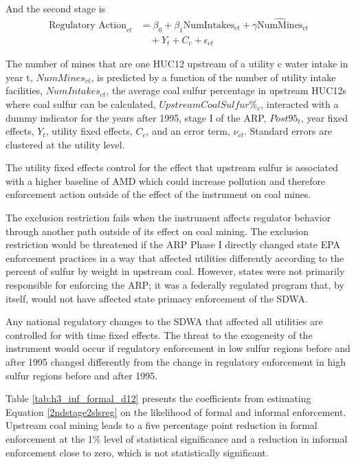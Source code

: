 \documentclass{article}
\begin{document}
And the second stage is
\begin{equation}\label{2ndstage2slsreg}
\begin{split}
\text{Regulatory Action}_{ct} &= \beta_0 + \beta_1\text{NumIntakes}_{ct} + \gamma\widehat{\text{NumMines}}_{ct} \\
&\quad + Y_t + C_c + \epsilon_{ct}
\end{split}
\end{equation}

The number of mines that are one HUC12 upstream of a utility c water intake in year t, $NumMines_{ct}$, is predicted by a function of the number of utility intake facilities, $NumIntakes_{ct}$, the average coal sulfur percentage in upstream HUC12s where coal sulfur can be calculated, $UpstreamCoalSulfur\%_c$, interacted with a dummy indicator for the years after 1995, stage I of the ARP, $Post95_t$, year fixed effects, $Y_t$, utility fixed effects, $C_c$, and an error term, $\nu_{ct}$. Standard errors are clustered at the utility level.

The utility fixed effects control for the effect that upstream sulfur is associated with a higher baseline of AMD which could increase pollution and therefore enforcement action outside of the effect of the instrument on coal mines.

The exclusion restriction fails when the instrument affects regulator behavior through another path outside of its effect on coal mining. The exclusion restriction would be threatened if the ARP Phase I directly changed state EPA enforcement practices in a way that affected utilities differently according to the percent of sulfur by weight in upstream coal. However, states were not primarily responsible for enforcing the ARP; it was a federally regulated program that, by itself, would not have affected state primacy enforcement of the SDWA.

Any national regulatory changes to the SDWA that affected all utilities are controlled for with time fixed effects. The threat to the exogeneity of the instrument would occur if regulatory enforcement in low sulfur regions before and after 1995 changed differently from the change in regulatory enforcement in high sulfur regions before and after 1995.

Table \ref{tab:h3_inf_formal_d12} presents the coefficients from estimating Equation \ref{2ndstage2slsreg} on the likelihood of formal and informal enforcement. Upstream coal mining leads to a five percentage point reduction in formal enforcement at the 1\% level of statistical significance and a reduction in informal enforcement close to zero, which is not statistically significant.
\end{document}
